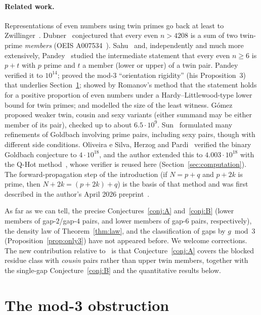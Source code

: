 \documentclass[11pt]{article}
\theoremstyle{definition}
\theoremstyle{remark}
\begin{document}
\paragraph{Related work.}
Representations of even numbers using twin primes go back at least to
Zwillinger~\cite{Zwillinger}. Dubner~\cite{Dubner} conjectured that every even
$n>4208$ is a sum of two twin-prime \emph{members} (OEIS
A007534~\cite{A007534}). Sahu~\cite{Sahu} and, independently and much more
extensively, Pandey~\cite{Pandey} studied the intermediate statement that every
even $n\ge 6$ is $p+t$ with $p$ prime and $t$ a member (lower or upper) of a
twin pair. Pandey verified it to $10^{14}$; proved the mod-3
``orientation rigidity'' (his Proposition~3) that underlies Section~\ref{sec:mod3};
showed by Romanov's method that the statement holds for a positive proportion of even
numbers under a Hardy--Littlewood-type lower bound for twin primes; and modelled the size
of the least witness. Gómez~\cite{Gomez}
proposed weaker twin, cousin and sexy variants (either summand may be either
member of its pair), checked up to about $6.5\cdot 10^9$. Sun~\cite{Sun}
formulated many refinements of Goldbach involving prime pairs, including sexy
pairs, though with different side conditions. Oliveira e Silva, Herzog and
Pardi~\cite{OHP} verified the binary Goldbach conjecture to $4\cdot 10^{18}$, and the
author extended this to $4.003\cdot10^{18}$ with the Q-Hot method~\cite{QHot2}, whose
verifier is reused here (Section~\ref{sec:computation}). The forward-propagation
step of the introduction (if $N=p+q$ and $p+2k$ is prime, then
$N+2k=(p+2k)+q$) is the basis of that method and was first described in the
author's April 2026 preprint~\cite{QHot}.

As far as we can tell, the precise Conjectures~\ref{conj:A} and~\ref{conj:B}
(lower members of gap-$2$/gap-$4$ pairs, and lower members of gap-$6$ pairs,
respectively), the density law of Theorem~\ref{thm:law}, and the
classification of gaps by $g \bmod 3$ (Proposition~\ref{prop:only3}) have not
appeared before. We welcome corrections. The new contribution relative
to~\cite{Pandey} is that Conjecture~\ref{conj:A} covers the blocked residue
class with \emph{cousin} pairs rather than upper twin members, together with the
single-gap Conjecture~\ref{conj:B} and the quantitative results below.

\section{The mod-3 obstruction}\label{sec:mod3}
\end{document}
